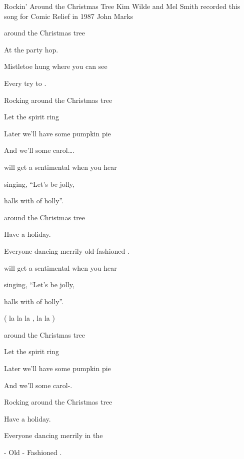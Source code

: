 \begin{SBSong}{Rockin' Around the Christmas Tree}
    {Kim Wilde and Mel Smith recorded this song for Comic Relief in 1987}
    {John Marks}
  \begin{SBVerse}
     around the Christmas tree
    
    At the  party hop.
    
    Mistletoe hung where you can see
    
    Every  try to .
    
    Rocking around the Christmas tree
    
    Let the  spirit ring
    
    Later we'll have some pumpkin pie
    
    And we'll  some carol\ldots{}.
  \end{SBVerse}
  \begin{SBVerse}
     will get a sentimental  when you hear
    
     singing, ``Let's be jolly,
    
      halls with  of holly''.
    
     around the Christmas tree
    
    Have a  holiday.
    
    Everyone dancing merrily
     old-fashioned .
  \end{SBVerse}
  
  \begin{SBVerse}
     will get a sentimental  when you hear
    
     singing, ``Let's be jolly,
    
      halls with  of holly''.
    
    ( la la la , la la  )
  \end{SBVerse}
  \begin{SBVerse}
     around the Christmas tree
    
    Let the  spirit ring
    
    Later we'll have some pumpkin pie
    
    And we'll  some carol-.
    
    Rocking around the Christmas tree
    
    Have a  holiday.
    
    Everyone dancing merrily in the
    
     - Old - Fashioned .  
  \end{SBVerse}
\end{SBSong}
